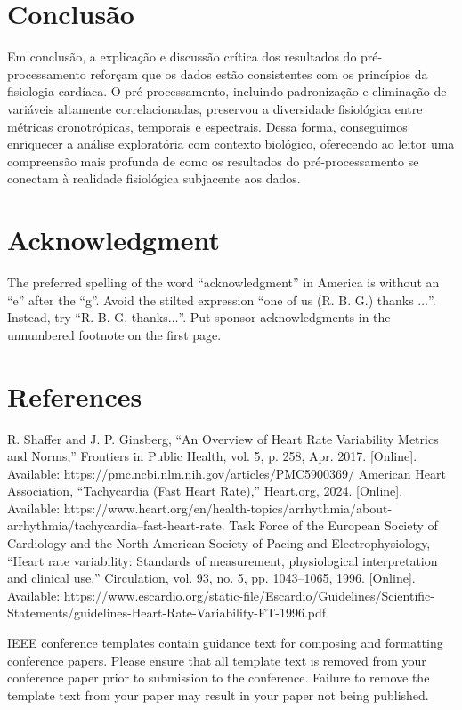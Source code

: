 \documentclass[conference]{IEEEtran}
\begin{document}
\section{Conclusão}

Em conclusão, a explicação e discussão crítica dos resultados do pré-processamento reforçam que os dados estão consistentes com os princípios da fisiologia cardíaca. O pré-processamento, incluindo padronização e eliminação de variáveis altamente correlacionadas, preservou a diversidade fisiológica entre métricas cronotrópicas, temporais e espectrais. Dessa forma, conseguimos enriquecer a análise exploratória com contexto biológico, oferecendo ao leitor uma compreensão mais profunda de como os resultados do pré-processamento se conectam à realidade fisiológica subjacente aos dados.

\section*{Acknowledgment}

The preferred spelling of the word ``acknowledgment'' in America is without 
an ``e'' after the ``g''. Avoid the stilted expression ``one of us (R. B. 
G.) thanks $\ldots$''. Instead, try ``R. B. G. thanks$\ldots$''. Put sponsor 
acknowledgments in the unnumbered footnote on the first page.

\section*{References}

\begin{thebibliography}{00}
 R. Shaffer and J. P. Ginsberg, “An Overview of Heart Rate Variability Metrics and Norms,” Frontiers in Public Health, vol. 5, p. 258, Apr. 2017. [Online]. Available: https://pmc.ncbi.nlm.nih.gov/articles/PMC5900369/
 American Heart Association, “Tachycardia (Fast Heart Rate),” Heart.org, 2024. [Online]. Available: https://www.heart.org/en/health-topics/arrhythmia/about-arrhythmia/tachycardia--fast-heart-rate.
 Task Force of the European Society of Cardiology and the North American Society of Pacing and Electrophysiology, “Heart rate variability: Standards of measurement, physiological interpretation and clinical use,” Circulation, vol. 93, no. 5, pp. 1043–1065, 1996. [Online]. Available: https://www.escardio.org/static-file/Escardio/Guidelines/Scientific-Statements/guidelines-Heart-Rate-Variability-FT-1996.pdf
\end{thebibliography}

\vspace{12pt}
\color{red}
IEEE conference templates contain guidance text for composing and formatting conference papers. Please ensure that all template text is removed from your conference paper prior to submission to the conference. Failure to remove the template text from your paper may result in your paper not being published.
\end{document}
